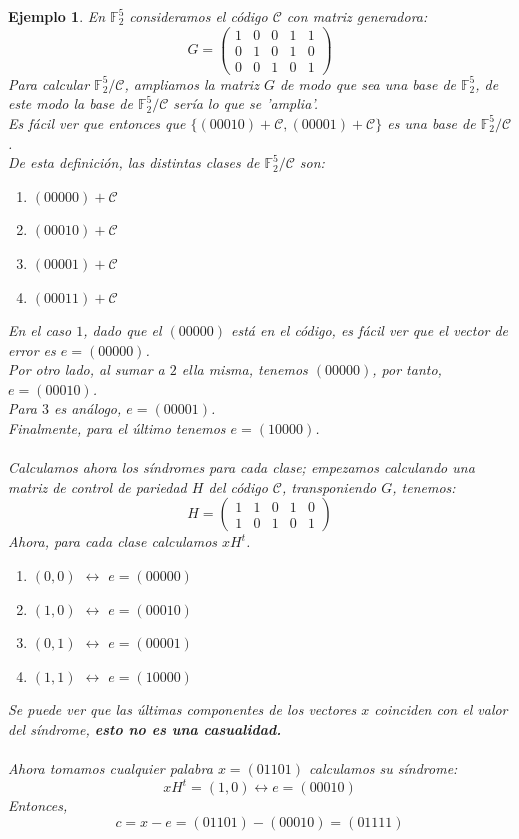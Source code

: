 \documentclass[spanish]{book}
\newtheorem{ejem}{Ejemplo}
\begin{document}
\begin{ejem}
	En $\mathbb{F}_2^5$ consideramos el código $\mathcal{C}$ con matriz generadora:
		$$G=
		\left(
		\begin{array}{ccccc}
		1 & 0 & 0 & 1 & 1 \\
		0 & 1 & 0 & 1 & 0 \\
		0 & 0 & 1 & 0 & 1
		\end{array} \right)
		$$
	Para calcular $\mathbb{F}^5_2/\mathcal{C}$, ampliamos la matriz $G$ de modo que sea una base de $\mathbb{F}^5_2$, de este modo la base de $\mathbb{F}^5_2/\mathcal{C}$ sería lo que se 'amplia'. \\
	Es fácil ver que entonces que $\{(00010)+\mathcal{C}, (00001)+\mathcal{C}\}$ es una base de $\mathbb{F}^5_2/\mathcal{C}$. \\
	De esta definición, las distintas clases de $\mathbb{F}^5_2/\mathcal{C}$ son:
	\begin{enumerate}
		\item $(00000)+\mathcal{C}$
		\item $(00010)+\mathcal{C}$
		\item $(00001)+\mathcal{C}$
		\item $(00011)+\mathcal{C}$
	\end{enumerate}
	
	En el caso $1$, dado que el $(00000)$ está en el código, es fácil ver que el vector de error es $e=(00000)$. \\
	Por otro lado, al sumar a $2$ ella misma, tenemos $(00000)$, por tanto, $e=(00010)$. \\
	Para $3$ es análogo, $e=(00001)$. \\
	Finalmente, para el último tenemos $e=(10000)$. \\ \\
	Calculamos ahora los síndromes para cada clase; empezamos calculando una matriz de control de pariedad $H$ del código $\mathcal{C}$, transponiendo $G$, tenemos:
		$$H=
		\left(
		\begin{array}{ccccc}
		1 & 1 & 0 & 1 & 0 \\
		1 & 0 & 1 & 0 & 1
		\end{array} \right)
		$$
	Ahora, para cada clase calculamos $x H^t$.
	\begin{enumerate}
		\item $(0, 0)$ $\longleftrightarrow$ $e=(00000)$
		\item $(1, 0)$ $\longleftrightarrow$ $e=(00010)$
		\item $(0, 1)$ $\longleftrightarrow$ $e=(00001)$
		\item $(1, 1)$ $\longleftrightarrow$ $e=(10000)$
	\end{enumerate}
	Se puede ver que las últimas componentes de los vectores $x$ coinciden con el valor del síndrome, \textbf{esto no es una casualidad.} \\ \\
	Ahora tomamos cualquier palabra $x=(01101)$ calculamos su síndrome:
	$$ xH^t=(1, 0) \longleftrightarrow e=(00010)$$
	Entonces, $$c=x-e=(01101)-(00010)=(01111)$$
\end{ejem}
\end{document}
